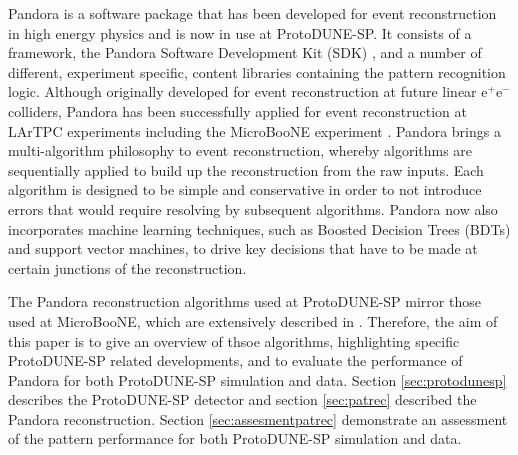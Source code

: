 Pandora is a software package that has been developed for event reconstruction in high energy physics and is now in use at ProtoDUNE-SP.  It consists of a framework, the Pandora Software Development Kit (SDK) \cite{pandorasdk}, and a number of different, experiment specific, content libraries containing the pattern recognition logic.  Although originally developed for event reconstruction at future linear $\text{e}^{+}\text{e}^{-}$ colliders, Pandora has been successfully applied for event reconstruction at LArTPC experiments including the MicroBooNE experiment \cite{pandorauboone}.  Pandora brings a multi-algorithm philosophy to event reconstruction, whereby algorithms are sequentially applied to build up the reconstruction from the raw inputs.  Each algorithm is designed to be simple and conservative in order to not introduce errors that would require resolving by subsequent algorithms.  Pandora now also incorporates machine learning techniques, such as Boosted Decision Trees (BDTs) and support vector machines, to drive key decisions that have to be made at certain junctions of the reconstruction. 

The Pandora reconstruction algorithms used at ProtoDUNE-SP mirror those used at MicroBooNE, which are extensively described in \cite{pandorauboone}.  Therefore, the aim of this paper is to give an overview of thsoe algorithms, highlighting specific ProtoDUNE-SP related developments, and to evaluate the performance of Pandora for both ProtoDUNE-SP simulation and data.  Section \ref{sec:protodunesp} describes the ProtoDUNE-SP detector and section \ref{sec:patrec} described the Pandora reconstruction.  Section \ref{sec:assesmentpatrec} demonstrate an assessment of the pattern performance for both ProtoDUNE-SP simulation and data.  


